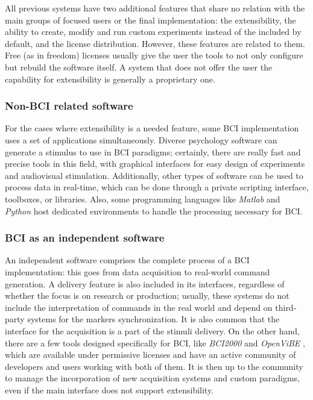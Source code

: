 All previous systems have two additional features that share no relation with the main groups of focused users or the final implementation: the extensibility, the ability to create, modify and run custom experiments instead of the included by default, and the license distribution. However, these features are related to them. Free (as in freedom) licenses usually give the user the tools to not only configure but rebuild the software itself. A system that does not offer the user the capability for extensibility is generally a proprietary one. 



\subsubsection{Non-\gls*{BCI} related software}

For the cases where extensibility is a needed feature, some \gls*{BCI} implementation uses a set of applications simultaneously. Diverse psychology software can generate a stimulus to use in \gls*{BCI} paradigms; certainly, there are really fast and precise tools in this field, with graphical interfaces for easy design of experiments and audiovisual stimulation. Additionally, other types of software can be used to process data in real-time, which can be done through a private scripting interface, toolboxes, or libraries. Also, some programming languages like \textit{Matlab} \cite{martinez2021open, choudhury2019implementation} and \textit{Python} \cite{GramfortEtAl2013a} host dedicated environments to handle the processing necessary for \gls*{BCI}.

\subsubsection{\gls*{BCI} as an independent software}

An independent software comprises the complete process of a \gls*{BCI} implementation: this goes from data acquisition to real-world command generation. A delivery feature is also included in its interfaces, regardless of whether the focus is on research or production; usually, these systems do not include the interpretation of commands in the real world and depend on third-party systems for the markers synchronization. It is also common that the interface for the acquisition is a part of the stimuli delivery. On the other hand, there are a few tools designed specifically for \gls*{BCI}, like \textit{BCI2000} \cite{schalk2004bci2000} and \textit{OpenViBE} \cite{renard2010openvibe}, which are available under permissive licenses and have an active community of developers and users working with both of them. It is then up to the community to manage the incorporation of new acquisition systems and custom paradigms, even if the main interface does not support extensibility.

